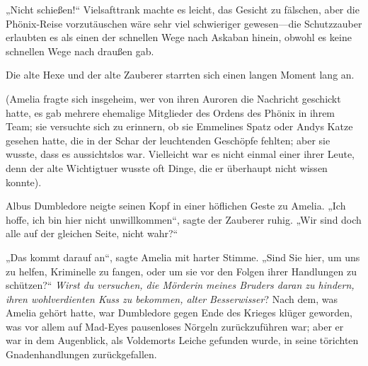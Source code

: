 „Nicht schießen!“ Vielsafttrank machte es leicht, das Gesicht zu fälschen, aber die Phönix-Reise vorzutäuschen wäre sehr viel schwieriger gewesen—die Schutzzauber erlaubten es als einen der schnellen Wege nach Askaban hinein, obwohl es keine schnellen Wege nach draußen gab.

Die alte Hexe und der alte Zauberer starrten sich einen langen Moment lang an.

(Amelia fragte sich insgeheim, wer von ihren Auroren die Nachricht geschickt hatte, es gab mehrere ehemalige Mitglieder des Ordens des Phönix in ihrem Team; sie versuchte sich zu erinnern, ob sie Emmelines Spatz oder Andys Katze gesehen hatte, die in der Schar der leuchtenden Geschöpfe fehlten; aber sie wusste, dass es aussichtslos war. Vielleicht war es nicht einmal einer ihrer Leute, denn der alte Wichtigtuer wusste oft Dinge, die er überhaupt nicht wissen konnte).

Albus Dumbledore neigte seinen Kopf in einer höflichen Geste zu Amelia. „Ich hoffe, ich bin hier nicht unwillkommen“, sagte der Zauberer ruhig. „Wir sind doch alle auf der gleichen Seite, nicht wahr?“

„Das kommt darauf an“, sagte Amelia mit harter Stimme. „Sind Sie hier, um uns zu helfen, Kriminelle zu fangen, oder um sie vor den Folgen ihrer Handlungen zu schützen?“ \emph{Wirst du versuchen, die Mörderin meines Bruders daran zu hindern, ihren wohlverdienten Kuss zu bekommen, alter} \emph{Besserwisser}? Nach dem, was Amelia gehört hatte, war Dumbledore gegen Ende des Krieges klüger geworden, was vor allem auf Mad-Eyes pausenloses Nörgeln zurückzuführen war; aber er war in dem Augenblick, als Voldemorts Leiche gefunden wurde, in seine törichten Gnadenhandlungen zurückgefallen.

